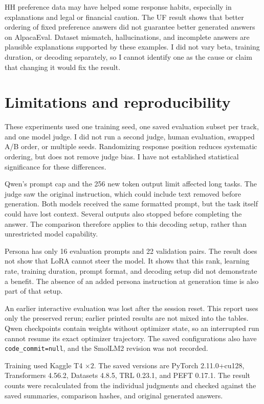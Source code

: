 \documentclass[11pt,a4paper]{article}
\newcommand{\code}[1]{\texttt{\small #1}}
\begin{document}
HH preference data may have helped some response habits, especially in explanations and legal or financial caution. The UF result shows that better ordering of fixed preference answers did not guarantee better generated answers on AlpacaEval. Dataset mismatch, hallucinations, and incomplete answers are plausible explanations supported by these examples. I did not vary beta, training duration, or decoding separately, so I cannot identify one as the cause or claim that changing it would fix the result.

\section{Limitations and reproducibility}

These experiments used one training seed, one saved evaluation subset per track, and one model judge. I did not run a second judge, human evaluation, swapped A/B order, or multiple seeds. Randomizing response position reduces systematic ordering, but does not remove judge bias. I have not established statistical significance for these differences.

Qwen's prompt cap and the 256 new token output limit affected long tasks. The judge saw the original instruction, which could include text removed before generation. Both models received the same formatted prompt, but the task itself could have lost context. Several outputs also stopped before completing the answer. The comparison therefore applies to this decoding setup, rather than unrestricted model capability.

Persona has only 16 evaluation prompts and 22 validation pairs. The result does not show that LoRA cannot steer the model. It shows that this rank, learning rate, training duration, prompt format, and decoding setup did not demonstrate a benefit. The absence of an added persona instruction at generation time is also part of that setup.

An earlier interactive evaluation was lost after the session reset. This report uses only the preserved rerun; earlier printed results are not mixed into the tables. Qwen checkpoints contain weights without optimizer state, so an interrupted run cannot resume its exact optimizer trajectory. The saved configurations also have \code{code\_commit=null}, and the SmolLM2 revision was not recorded.

Training used Kaggle T4 $\times2$. The saved versions are PyTorch 2.11.0+cu128, Transformers 4.56.2, Datasets 4.8.5, TRL 0.23.1, and PEFT 0.17.1. The result counts were recalculated from the individual judgments and checked against the saved summaries, comparison hashes, and original generated answers.
\end{document}
